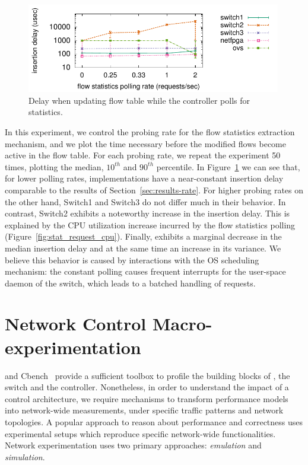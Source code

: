 \begin{figure}[t]
  \begin{center}
    \includegraphics[width=0.99\textwidth]{Chapter1/Chapter1Figs/interaction_test}
  \end{center}
  \caption{Delay when updating  flow table while the controller polls
    for statistics.}
  \label{fig:interaction_test}
\end{figure}

In this experiment, we control the probing rate for the flow statistics
extraction mechanism, and we plot the time necessary before the modified flows
become active in the flow table. For each probing rate, we repeat the experiment
50 times, plotting the median, $10^{th}$ and $90^{th}$ percentile. In
Figure~\ref{fig:interaction_test} we can see that, for lower polling rates,
implementations have a near-constant insertion delay comparable to the results
of Section~\ref{sec:results-rate}.  For higher probing rates on the other hand,
Switch1 and Switch3 do not differ much in their behavior. In contrast, Switch2
exhibits a noteworthy increase in the insertion delay. This is explained by the
CPU utilization increase incurred by the flow statistics polling
(Figure~\ref{fig:stat_request_cpu}). Finally, \ovs exhibits a marginal decrease
in the median insertion delay and at the same time an increase in its variance.
We believe this behavior is caused by interactions with the OS scheduling
mechanism: the constant polling causes frequent interrupts for the user-space
daemon of the switch, which leads to a batched handling of requests.

\section{Network Control Macro-experimentation} \label{sec:sdnsim-intro}

\oflops and Cbench~ provide a sufficient toolbox to profile the
building blocks of \of, the switch and the controller.  Nonetheless, in order to
understand the impact of a control architecture, we require
mechanisms to transform \of performance models into network-wide measurements,
under specific traffic patterns and network topologies.  A popular approach to
reason about performance and correctness uses experimental setups which
reproduce specific network-wide functionalities.  Network experimentation uses
two primary approaches: \textit{emulation} and \textit{simulation}.

